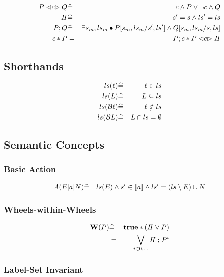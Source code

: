 \begin{eqnarray*}
   P \mathrel{\lhd{c}\rhd} Q
   &\widehat=&
   c \land P \lor \lnot c \land Q
\\ I\!I
   &\widehat=&
   s'= s \land ls'=ls
\\ P ; Q
   &\widehat=&
   \exists s_m,ls_m \bullet P[s_m,ls_m/s',ls'] \land Q[s_m,ls_m/s,ls]
\\ c * P
   &=&
   P ; c * P \mathrel{\lhd{c}\rhd} I\!I
\end{eqnarray*}

\subsection{Shorthands}

\begin{eqnarray*}
   ls(\ell) &\widehat=& \ell \in ls
\\ ls(L) &\widehat=& L \subseteq ls
\\ ls(\mathcal{B}\ell) &\widehat=& \ell \notin ls
\\ ls(\mathcal{B} L) &\widehat=& L \cap ls = \emptyset
\end{eqnarray*}

\subsection{Semantic Concepts}

\subsubsection{Basic Action}

\begin{eqnarray*}
   A(E|a|N)
   &\widehat=&
   ls(E) \land s' \in [\![{a}]\!] \land ls'=(ls\setminus E) \cup N
\end{eqnarray*}


\subsubsection{Wheels-within-Wheels}

\begin{eqnarray*}
   \mathbf{W}(P) &\widehat=& \mathbf{true} * (I\!I \lor P)
\\         &  =  & \bigvee_{i \in 0,\dots} I\!I \mathrel{;} P^i
\end{eqnarray*}

\subsubsection{Label-Set Invariant}

